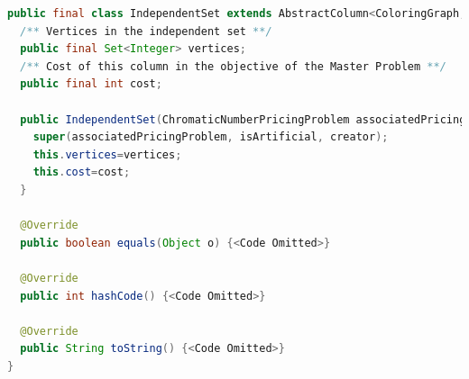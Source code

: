 \documentclass[a4paper]{article}
\newenvironment{myblock}[1]{%
    \tcolorbox[beamer,%
    noparskip,breakable,
    colback=lightBlueCodeBlock,colframe=darkBlueCodeBlock,%
    colbacklower=darkBlueCodeBlock!75!lightBlueCodeBlock,%
    coltitle=blueTitleCodeBlock,
    title=#1]}%
    {\endtcolorbox}
\begin{document}
\begin{myblock}{IndependentSet}
\begin{lstlisting}[language=java, style=eclipseArticle, xleftmargin=2em]  
public final class IndependentSet extends AbstractColumn<ColoringGraph, ChromaticNumberPricingProblem> {
  /** Vertices in the independent set **/
  public final Set<Integer> vertices;
  /** Cost of this column in the objective of the Master Problem **/
  public final int cost;

  public IndependentSet(ChromaticNumberPricingProblem associatedPricingProblem, boolean isArtificial, String creator, Set<Integer> vertices, int cost) {
    super(associatedPricingProblem, isArtificial, creator);
    this.vertices=vertices;
    this.cost=cost;
  }

  @Override
  public boolean equals(Object o) {<Code Omitted>}

  @Override
  public int hashCode() {<Code Omitted>}

  @Override
  public String toString() {<Code Omitted>}
}
\end{lstlisting}
\end{myblock}
\end{document}
